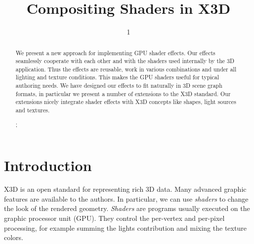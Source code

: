 \documentclass{egpubl}
\title{Compositing Shaders in X3D}
\author{1} %
\begin{document}

\maketitle

\begin{abstract}
We present a new approach for implementing GPU shader effects.
Our effects seamlessly cooperate with each other and with
the shaders used internally by the 3D application.
Thus the effects are reusable, work in various combinations
and under all lighting and texture conditions.
This makes the GPU shaders useful for typical authoring needs.
We have designed our effects to fit naturally in 3D scene graph formats,
in particular we present a number of extensions to the X3D standard.
Our extensions nicely integrate shader effects with X3D
concepts like shapes, light sources and textures.


\begin{classification}
  ;
\end{classification}

\end{abstract}


\section{Introduction}


X3D \cite{x3d:spec} is an open standard for representing rich 3D data.
Many advanced graphic features are available to the authors.
In particular, we can use \emph{shaders} to change the look of the rendered
geometry.
\emph{Shaders} are programs usually executed on the graphic processor unit
(GPU). They control the per-vertex and per-pixel processing,
for example summing the lights contribution
and mixing the texture colors.
\end{document}
